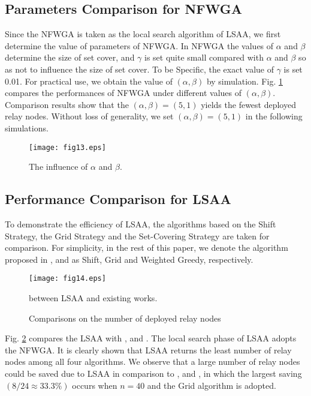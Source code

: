 \documentclass[journal]{IEEEtran}
\begin{document}
\subsection{Parameters Comparison for NFWGA}
Since the NFWGA is taken as the local search algorithm of LSAA, we first determine the value of parameters of NFWGA. In NFWGA the values of $\alpha$ and $\beta$ determine the size of set cover, and $\gamma$ is set quite small compared with $\alpha$ and $\beta$ so as not to influence the size of set cover. To be Specific, the exact value of $\gamma$ is set 0.01. For practical use, we obtain the value of $(\alpha, \beta)$ by simulation.
Fig. \ref{fig13} compares the performances of NFWGA under different values of $(\alpha, \beta)$. Comparison results show that the $(\alpha,\beta) =(5,1)$ yields the fewest deployed relay nodes. Without loss of generality, we set $(\alpha,\beta) =(5,1)$ in the following simulations.

\begin{figure}
\begin{center}
\texttt{[image: fig13.eps]}    \caption{The influence of $\alpha$ and $\beta$.}
\label{fig13}                                 \end{center}                                 \end{figure}

\subsection{Performance Comparison for LSAA}
To demonstrate the efficiency of LSAA, the algorithms based on the Shift Strategy, the Grid Strategy and the Set-Covering Strategy are taken for comparison. For simplicity, in the rest of this paper, we denote the algorithm proposed in \cite{Tang06}, \cite{Franceschetti01} and \cite{Ali11} as Shift, Grid and Weighted
Greedy, respectively.

\begin{figure}
\begin{center}
\texttt{[image: fig14.eps]}    \caption{Comparisons on the number of deployed relay nodes} between LSAA and existing works.
\label{fig14}                                 \end{center}                                 \end{figure}

 Fig. \ref{fig14} compares the LSAA with \cite{Tang06}, \cite{Franceschetti01} and \cite{Ali11}. The local search phase of LSAA adopts the NFWGA.  It is clearly shown that LSAA returns the least number of relay nodes among all four algorithms. We observe that a large number of relay nodes could be saved due to LSAA in comparison to \cite{Tang06}, \cite{Franceschetti01} and \cite{Ali11}, in which the largest saving $(8/24\approx 33.3\%)$ occurs when $n=40$ and the Grid algorithm is adopted.
\end{document}
